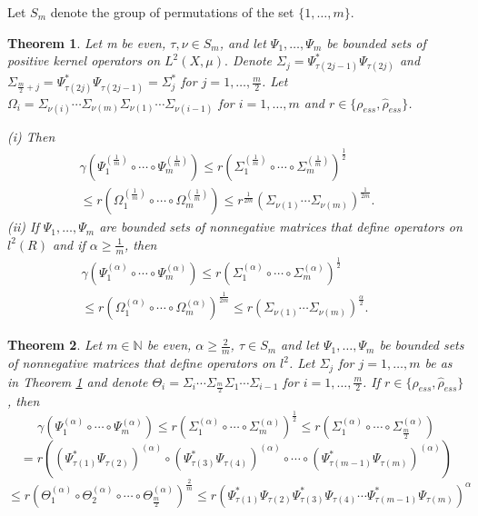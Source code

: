 \documentclass[12pt, reqno]{amsart}
\newtheorem{theorem}{Theorem}[section]
\theoremstyle{definition}
\theoremstyle{remark}
\numberwithin{equation}{section}
\newcommand{\be}{\begin{equation}}
\newcommand{\ee}{\end{equation}}
\newcommand{\NN}{\mathbb{N}}
\begin{document}

Let $S_m$ denote the group of permutations of the set $\{1, \ldots , m \}$. 

\begin{theorem}
\label{zivalska_ess}
 Let m be even, $\tau, \nu\in S_m$, 
  and let $\Psi_1, \ldots , \Psi_m$ be bounded sets of positive kernel operators on $L^2(X, \mu).$ Denote $\Sigma_j=\Psi_{\tau(2j-1)}^*\Psi_{\tau(2j)}$ and $\Sigma_{\frac{m}{2}+j}=\Psi_{\tau(2j)}^*\Psi_{\tau(2j-1)}=\Sigma_{j}^*$ for $j=1, \ldots , \frac{m}{2}$. Let $\Omega_i=\Sigma_{\nu(i)}\cdots\Sigma_{\nu(m)}\Sigma_{\nu(1)}\cdots\Sigma_{\nu(i-1)}$ for $i=1, \ldots , m$ and $r\in\{\rho_{ess}, \hat{\rho}_{ess}\}$.
  
\noindent  (i) Then
\begin{align}
\nonumber
\gamma( \Psi_1^{(\frac{1}{m})}\circ\cdots\circ\Psi_m^{(\frac{1}{m})}) \le r(\Sigma_1^{(\frac{1}{m})}\circ\cdots\circ\Sigma_m^{(\frac{1}{m})})^{\frac{1}{2}}\;\;\;\;\;\;\;\;\;\;\;\;\;\\
\le r(\Omega_1^{(\frac{1}{m})}\circ\cdots\circ\Omega_m^{(\frac{1}{m})})\le r^{\frac{1}{2m}}(\Sigma_{\nu(1)}\cdots\Sigma_{\nu(m)})^{\frac{1}{2m}}.
\label{ziv1}
\end{align}
\noindent (ii) If $\Psi_1, \ldots , \Psi_m$ are bounded sets of nonnegative matrices that define operators on $l^2(R)$ and if $\alpha\ge\frac{1}{m}$, then
\begin{align}
\nonumber
\gamma (\Psi_1^{(\alpha)}\circ\cdots\circ\Psi_m^{(\alpha)}) \le r(\Sigma_1^{(\alpha)}\circ\cdots\circ\Sigma_m^{(\alpha)})^{\frac{1}{2}}\;\;\;\;\;\;\;\;\;\;\;\;\;\;\\
\le r(\Omega_1^{(\alpha)}\circ\cdots\circ\Omega_m^{(\alpha)})^{\frac{1}{2m}} \le r(\Sigma_{\nu(1)}\cdots\Sigma_{\nu(m)})^{\frac{\alpha}{2}}.
\label{ziv2}
\end{align}
\end{theorem}

\medskip

\begin{theorem}
Let $m\in\NN$ be even, $\alpha\ge\frac{2}{m}$, $\tau\in S_m$ and let $\Psi_1, \ldots , \Psi_m$ be bounded sets of nonnegative matrices that define operators on $l^2$. Let $\Sigma_j$ for $j=1, \ldots , m$ be as in Theorem \ref{zivalska_ess} and denote $\Theta_i=\Sigma_i\cdots\Sigma_{\frac{m}{2}}\Sigma_1\cdots\Sigma_{i-1}$ for $i=1, \ldots , \frac{m}{2}$. If $r\in\{\rho_{ess}, \hat{\rho}_{ess}\}$, then
$$\gamma(\Psi_1^{(\alpha)}\circ\cdots\circ\Psi_m^{(\alpha)}) \le r(\Sigma_1^{(\alpha)}\circ\cdots\circ\Sigma_m^{(\alpha)})^{\frac{1}{2}}\le r(\Sigma_1^{(\alpha)}\circ\cdots\circ\Sigma_{\frac{m}{2}}^{(\alpha)})$$
$$=r((\Psi_{\tau(1)}^*\Psi_{\tau(2)})^{(\alpha)}\circ(\Psi_{\tau(3)}^*\Psi_{\tau(4)})^{(\alpha)}\circ\cdots\circ(\Psi_{\tau(m-1)}^*\Psi_{\tau(m)})^{(\alpha)})$$
\be
\le r(\Theta_1^{(\alpha)}\circ\Theta_2^{(\alpha)}\circ\cdots\circ\Theta_{\frac{m}{2}}^{(\alpha)})^{\frac{2}{m}}\le
r(\Psi_{\tau(1)}^*\Psi_{\tau(2)}\Psi_{\tau(3)}^*\Psi_{\tau(4)}\cdots\Psi_{\tau(m-1)}^*\Psi_{\tau(m)})^{\alpha}
\label{zivalska_ess2}
\ee
\end{theorem}
\end{document}
